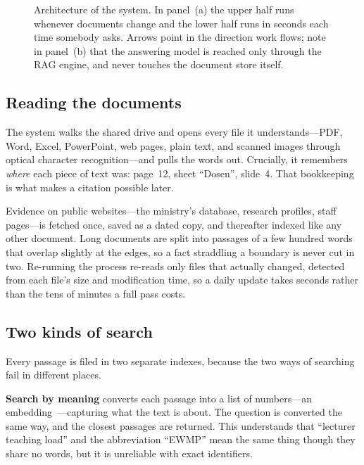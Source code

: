 \documentclass[conference]{IEEEtran}
\begin{document}
\begin{figure}[t]
\caption{Architecture of the system. In panel~(a) the upper half runs whenever
documents change and the lower half runs in seconds each time somebody asks.
Arrows point in the direction work flows; note in panel~(b) that the answering
model is reached only through the RAG engine, and never touches the document
store itself.}
\label{fig:arch}
\end{figure}

\subsection{Reading the documents}

The system walks the shared drive and opens every file it understands---PDF,
Word, Excel, PowerPoint, web pages, plain text, and scanned images through
optical character recognition---and pulls the words out. Crucially, it remembers
\emph{where} each piece of text was: page~12, sheet ``Dosen'', slide~4. That
bookkeeping is what makes a citation possible later.

Evidence on public websites---the ministry's database, research profiles, staff
pages---is fetched once, saved as a dated copy, and thereafter indexed like any
other document. Long documents are split into passages of a few hundred words that overlap
slightly at the edges, so a fact straddling a boundary is never cut in two.
Re-running the process re-reads only files that actually changed, detected from
each file's size and modification time, so a daily update takes seconds rather
than the tens of minutes a full pass costs.

\subsection{Two kinds of search}

Every passage is filed in two separate indexes, because the two ways of searching
fail in different places.

\textbf{Search by meaning} converts each passage into a list of numbers---an
embedding~\cite{bge}---capturing what the text is about. The question is
converted the same way, and the closest passages are returned. This understands
that ``lecturer teaching load'' and the abbreviation ``EWMP'' mean the same
thing though they share no words, but it is unreliable with exact identifiers.
\end{document}
